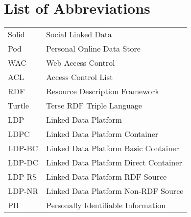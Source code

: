 \documentclass[master=cws,masteroption=gs,english]{kulemt/kulemt}
\begin{document}
\chapter{List of Abbreviations}
\begin{flushleft}
  \renewcommand{\arraystretch}{1.1}
  \begin{tabularx}{\textwidth}{@{}p{20mm}X@{}}
    Solid    & Social Linked Data \\
    Pod      & Personal Online Data Store \\
    WAC      & Web Access Control \\
    ACL      & Access Control List \\
    RDF      & Resource Description Framework \\
    Turtle   & Terse RDF Triple Language \\
    LDP      & Linked Data Platform \\
    LDPC     & Linked Data Platform Container \\
    LDP-BC   & Linked Data Platform Basic Container \\
    LDP-DC   & Linked Data Platform Direct Container \\
    LDP-RS   & Linked Data Platform RDF Source \\
    LDP-NR   & Linked Data Platform Non-RDF Source \\
    PII      & Personally Identifiable Information \\
  \end{tabularx}
\end{flushleft}
\end{document}
